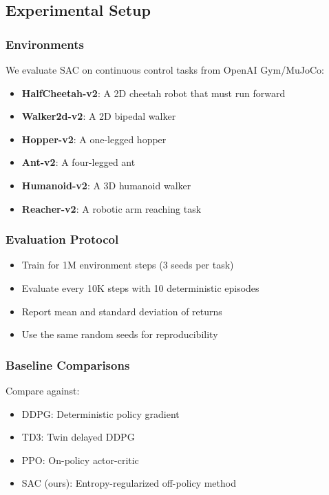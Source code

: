 \documentclass[11pt,a4paper]{article}
\begin{document}
\subsection{Experimental Setup}
\subsubsection{Environments}
We evaluate SAC on continuous control tasks from OpenAI Gym/MuJoCo:
\begin{itemize}
  \item \textbf{HalfCheetah-v2}: A 2D cheetah robot that must run forward
  \item \textbf{Walker2d-v2}: A 2D bipedal walker
  \item \textbf{Hopper-v2}: A one-legged hopper
  \item \textbf{Ant-v2}: A four-legged ant
  \item \textbf{Humanoid-v2}: A 3D humanoid walker
  \item \textbf{Reacher-v2}: A robotic arm reaching task
\end{itemize}

\subsubsection{Evaluation Protocol}
\begin{itemize}
  \item Train for 1M environment steps (3 seeds per task)
  \item Evaluate every 10K steps with 10 deterministic episodes
  \item Report mean and standard deviation of returns
  \item Use the same random seeds for reproducibility
\end{itemize}

\subsubsection{Baseline Comparisons}
Compare against:
\begin{itemize}
  \item DDPG: Deterministic policy gradient
  \item TD3: Twin delayed DDPG
  \item PPO: On-policy actor-critic
  \item SAC (ours): Entropy-regularized off-policy method
\end{itemize}
\end{document}
